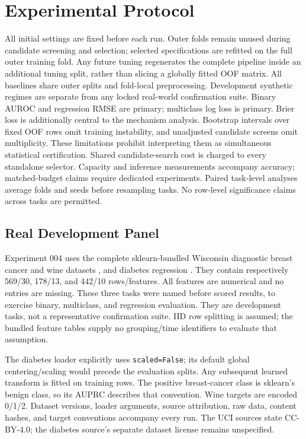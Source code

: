 \section{Experimental Protocol}
All initial settings are fixed before each run. Outer folds remain unused during
candidate screening and selection; selected specifications are refitted on the
full outer training fold. Any future tuning regenerates the complete pipeline
inside an additional tuning split, rather than slicing a globally fitted OOF
matrix. All baselines share outer splits and fold-local preprocessing.
Development synthetic regimes are separate from any locked real-world confirmation
suite. Binary AUROC and regression RMSE are primary; multiclass log loss is primary.
Brier loss is additionally central to the mechanism analysis. Bootstrap intervals
over fixed OOF rows omit training instability, and unadjusted candidate screens
omit multiplicity. These limitations prohibit interpreting them as simultaneous
statistical certification.
Shared candidate-search cost is charged to every standalone selector. Capacity
and inference measurements accompany accuracy; matched-budget claims require
dedicated experiments. Paired task-level analyses average folds and seeds before
resampling tasks. No row-level significance claims across tasks are permitted.

\subsection{Real Development Panel}
Experiment 004 uses the complete sklearn-bundled Wisconsin diagnostic breast
cancer and wine datasets \citep{wdbc1993,wine1992}, and diabetes regression
\citep{efron2004}. They contain respectively 569/30, 178/13, and 442/10
rows/features. All features are numerical and no entries are missing. These
three tasks were named before scored results, to exercise binary, multiclass,
and regression evaluation. They are development tasks, not a representative
confirmation suite. IID row splitting is assumed; the bundled feature tables
supply no grouping/time identifiers to evaluate that assumption.

The diabetes loader explicitly uses \texttt{scaled=False}; its default global
centering/scaling would precede the evaluation splits. Any subsequent learned
transform is fitted on training rows. The positive breast-cancer class is
sklearn's benign class, so its AUPRC describes that convention. Wine targets are
encoded 0/1/2. Dataset versions, loader arguments, source attribution, raw data,
content hashes, and target conventions accompany every run. The UCI sources
state CC-BY-4.0; the diabetes source's separate dataset license remains unspecified.

